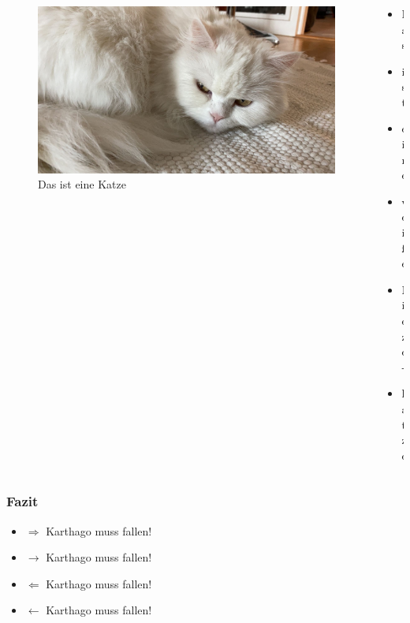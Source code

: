 \documentclass[ngerman]{beamer}
\begin{document}
\begin{frame}
\frametitle{}

\begin{columns}
\begin{column}{0.48\textwidth}

\begin{figure}
	\centering
	\includegraphics[width=\textwidth]{./Bilder/miau.jpg}
	\caption{Das ist eine Katze}\label{fig:mieze}
\end{figure}

\end{column}
\begin{column}{0.48\textwidth}
\begin{itemize}
	\item Das
	\item ist 
	\item eine
	\item weiße
	\item Mieze-
	\item katze
	\end{itemize}
\end{column}

\end{columns}


\end{frame}


\begin{frame}
	\frametitle{Fazit}
	
\begin{itemize}
	\item $\Rightarrow$ Karthago muss fallen! \pause
	\item $\rightarrow$ Karthago muss fallen!	\pause
	\item $\Leftarrow$ Karthago muss fallen! \pause
	\item $\leftarrow$ Karthago muss fallen!	
\end{itemize}	

\end{frame}
\end{document}
